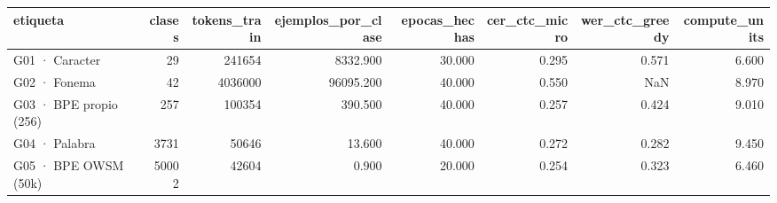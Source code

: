 \begin{tabular}{lrrrrrrr}
\toprule
etiqueta & clases & tokens_train & ejemplos_por_clase & epocas_hechas & cer_ctc_micro & wer_ctc_greedy & compute_units \\
\midrule
G01 · Caracter & 29 & 241654 & 8332.900 & 30.000 & 0.295 & 0.571 & 6.600 \\
G02 · Fonema & 42 & 4036000 & 96095.200 & 40.000 & 0.550 & NaN & 8.970 \\
G03 · BPE propio (256) & 257 & 100354 & 390.500 & 40.000 & 0.257 & 0.424 & 9.010 \\
G04 · Palabra & 3731 & 50646 & 13.600 & 40.000 & 0.272 & 0.282 & 9.450 \\
G05 · BPE OWSM (50k) & 50002 & 42604 & 0.900 & 20.000 & 0.254 & 0.323 & 6.460 \\
\bottomrule
\end{tabular}
